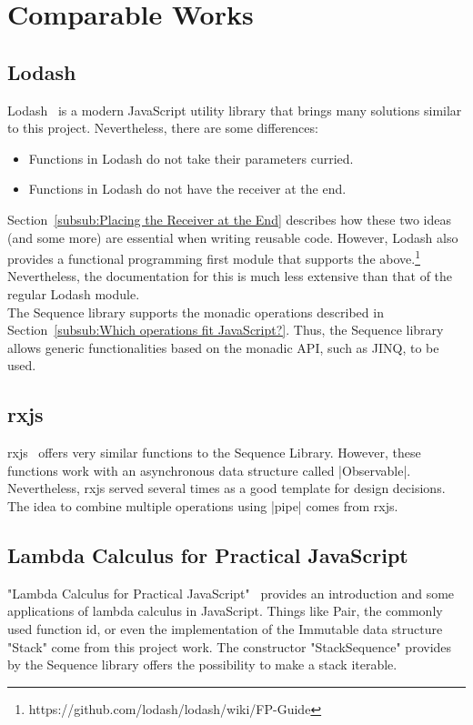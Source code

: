\section{Comparable Works} %
\label{sec:Comparable Works}

\subsection{Lodash} %
\label{sub:Lodash}
Lodash~\cite{lodash_2023} is a modern JavaScript utility library that brings many solutions
similar to this project. Nevertheless, there are some differences:
\begin{itemize}
  \item Functions in Lodash do not take their parameters curried.
  \item Functions in Lodash do not have the receiver at the end.
\end{itemize}
Section~\ref{subsub:Placing the Receiver at the End} describes how these two
ideas (and some more) are essential when writing reusable code. However, Lodash
also provides a functional programming first module that supports the
above.\footnote{https://github.com/lodash/lodash/wiki/FP-Guide}
Nevertheless, the documentation for this is much less extensive than that of
the regular Lodash module. \\ 
The Sequence library supports the monadic
operations described in Section~\ref{subsub:Which operations fit JavaScript?}.
Thus, the Sequence library allows generic functionalities based on the monadic
API, such as JINQ, to be used.

\subsection{rxjs} %
\label{sub:rxjs}
rxjs~\cite{rxjs_2023} offers very similar functions to the Sequence Library.
However, these functions work with an asynchronous data structure called
|Observable|. Nevertheless, rxjs served several times as a good template for
design decisions. The idea to combine multiple operations using |pipe| comes
from rxjs.

\subsection{Lambda Calculus for Practical JavaScript} %
\label{sub:Lambda Calculus for Practical JavaScript}
"Lambda Calculus for Practical JavaScript"~\cite{andermatt_lambda_2022}
provides an introduction and some applications of lambda calculus in
JavaScript. Things like Pair, the commonly used function id, or even the
implementation of the Immutable data structure "Stack" come from this project
work. The constructor "StackSequence" provides by the Sequence library offers
the possibility to make a stack iterable. 
